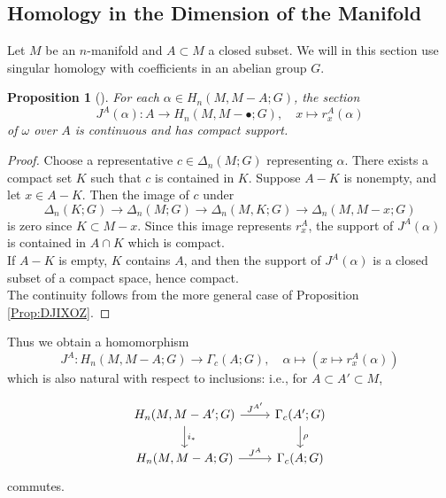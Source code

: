 \documentclass[reqno]{amsart}
\newtheorem{proposition}[theorem]{Proposition}
\theoremstyle{definition}
\theoremstyle{remark}
\begin{document}
\subsection{Homology in the Dimension of the Manifold}

Let $M$ be an $n$-manifold and $A \subset M$ a closed subset.
We will in this section use singular homology with coefficients
in an abelian group $G$.


\begin{proposition}[]
    For each $\alpha \in H_n(M, M - A ; G)$, the
    section
    \[
    J^{A}(\alpha) \colon
    A \to H_n(M, M - \bullet; G),
    \quad x \mapsto r_x^{A} (\alpha)
    \] 
    of $\omega$ over $A$ is continuous and has
    compact support.
\end{proposition}

\begin{proof}
    Choose a representative
    $c \in \Delta_n(M;G)$ representing $\alpha$.
    There exists a compact set $K$ such that
    $c$ is contained in $K$.
    Suppose $A - K$ is nonempty, and let $x \in A - K$.
    Then the image of $c$ under
    \[
    \Delta_n (K ; G) \to 
    \Delta_n(M;G) \to \Delta_n (M,K;G) 
    \to \Delta_n (M, M - x ; G)
    \] 
    is zero since
    $K \subset M - x$. Since this image
    represents
    $r_x^{A}$, the support of $J^{A}(\alpha)$ is
    contained in $A \cap K$ which is compact.\\
    If $A - K$ is empty, $K$ contains $A$, and then
    the support of $J ^{A}(\alpha)$ is a closed
    subset of a compact space, hence compact.\\
    \linebreak
    The continuity follows from the more general case of
    Proposition \ref{Prop:DJIXOZ}.
\end{proof}

Thus we obtain a homomorphism
\[
J^{A} \colon H_n(M, M - A; G) \to 
\Gamma_c (A;G), \quad
\alpha \mapsto \left( x \mapsto r_x^{A}(\alpha) \right) 
\] 
which is also natural with respect to inclusions: i.e., for
$A \subset A' \subset M$,

\begin{equation*}
\begin{tikzcd}
    H_n (M, M-A';G) \ar[r, "J^{A'}"] \ar[d, "i_*"] & 
    \Gamma_c(A';G) \ar[d, "\rho"] \\
    H_n(M, M-A;G) \ar[r, "J^{A}"] & \Gamma_c (A;G)
\end{tikzcd}
\end{equation*}
commutes.
\end{document}
